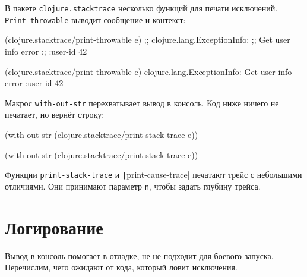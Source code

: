 
\mnoindent
В пакете \verb|clojure.stacktrace| несколько функций для печати
исключений. \verb|Print-throwable| выводит сообщение и контекст:

\ifx\DEVICETYPE\MOBILE

\begin{english}
  \begin{clojure}
(clojure.stacktrace/print-throwable e)
;; clojure.lang.ExceptionInfo:
;; Get user info error
;; {:user-id 42}
  \end{clojure}
\end{english}

\else

\begin{english}
  \begin{clojure}
(clojure.stacktrace/print-throwable e)
clojure.lang.ExceptionInfo: Get user info error
{:user-id 42}
  \end{clojure}
\end{english}

\fi

Макрос \verb|with-out-str| перехватывает вывод в консоль. Код ниже ничего не
печатает, но вернёт строку:

\ifx\DEVICETYPE\MOBILE

\begin{english}
  \begin{clojure}
(with-out-str
  (clojure.stacktrace/print-stack-trace
    e))
  \end{clojure}
\end{english}

\else

\begin{english}
  \begin{clojure}
(with-out-str
  (clojure.stacktrace/print-stack-trace e))
  \end{clojure}
\end{english}

\fi

Функции \verb|print-stack-trace| и \texttt|print-cause\--trace| печатают трейс с
небольшими отличиями. Они принимают параметр \verb|n|, чтобы задать глубину
трейса.

\section{Логирование}


Вывод в консоль помогает в отладке, не не подходит для боевого
запуска. Перечислим, чего ожидают от кода, который ловит исключения.

